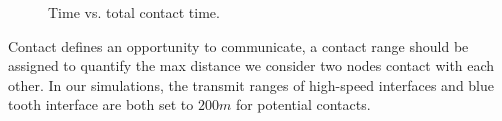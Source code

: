 \begin{figure}[!t]
\centering
{}
\caption{Time vs. total contact time.}\label{figure_contact_ct}
\end{figure}


Contact defines an opportunity to communicate, a contact range should be assigned to quantify the max distance we consider two nodes contact with each other. 
In our simulations, the transmit ranges of high-speed interfaces and blue tooth interface are both set to $200m$ for potential contacts. 

